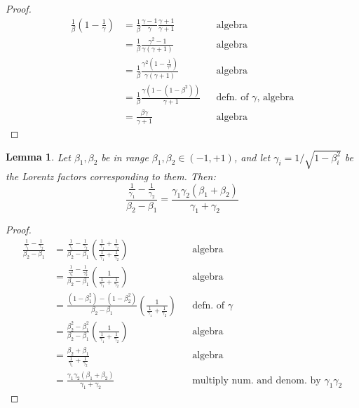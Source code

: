 \documentclass[a4paper]{article}
\theoremstyle{plain}
\newtheorem{lemma}[theorem]{Lemma}
\theoremstyle{definition}
\begin{document}
\begin{proof}
\begin{align*}
\frac{1}{\beta} (1-\frac{1}{\gamma})
  & = \frac{1}{\beta} \frac{\gamma-1}{\gamma} \frac{\gamma+1}{\gamma+1} & & \text{algebra} \\
  & = \frac{1}{\beta} \frac{\gamma^2-1}{\gamma(\gamma+1)} & & \text{algebra} \\
  & = \frac{1}{\beta} \frac{\gamma^2(1-\frac{1}{\gamma^2})}{\gamma(\gamma+1)} & & \text{algebra} \\
  & = \frac{1}{\beta} \frac{\gamma(1-(1-\beta^2))}{\gamma+1} & & \text{defn. of $\gamma$, algebra} \\
  & = \frac{\beta\gamma}{\gamma+1} & & \text{algebra}
\end{align*}
\end{proof}

\begin{lemma}
\label{lem:betaGammaIdentity2}
Let $\beta_1, \beta_2$ be in range $\beta_1, \beta_2 \in (-1, +1)$,
and let $\gamma_i = 1/\sqrt{1-\beta_i^2}$ be the Lorentz factors
corresponding to them.
Then:
\begin{equation}
\frac{\frac{1}{\gamma_1}-\frac{1}{\gamma_2}}{\beta_2-\beta_1}
  = \frac{\gamma_1\gamma_2(\beta_1+\beta_2)}{\gamma_1+\gamma_2}
\end{equation}
\end{lemma}

\begin{proof}
\begin{align*}
\frac{\frac{1}{\gamma_1}-\frac{1}{\gamma_2}}{\beta_2-\beta_1}
  & = \frac{\frac{1}{\gamma_1}-\frac{1}{\gamma_2}}{\beta_2-\beta_1} \left( \frac{\frac{1}{\gamma_1}+\frac{1}{\gamma_2}}{\frac{1}{\gamma_1}+\frac{1}{\gamma_2}} \right) & & \text{algebra} \\
  & = \frac{\frac{1}{\gamma_1^2}-\frac{1}{\gamma_2^2}}{\beta_2-\beta_1} \left( \frac{1}{\frac{1}{\gamma_1}+\frac{1}{\gamma_2}} \right) & & \text{algebra} \\
  & = \frac{(1-\beta_1^2)-(1-\beta_2^2)}{\beta_2-\beta_1} \left( \frac{1}{\frac{1}{\gamma_1}+\frac{1}{\gamma_2}} \right) & & \text{defn. of $\gamma$} \\
  & = \frac{\beta_2^2-\beta_1^2}{\beta_2-\beta_1} \left( \frac{1}{\frac{1}{\gamma_1}+\frac{1}{\gamma_2}} \right) & & \text{algebra} \\
  & = \frac{\beta_2+\beta_1}{\frac{1}{\gamma_1}+\frac{1}{\gamma_2}} & & \text{algebra} \\
  & = \frac{\gamma_1\gamma_2(\beta_1+\beta_2)}{\gamma_1+\gamma_2} & & \text{multiply num. and denom. by $\gamma_1\gamma_2$}
\end{align*}
\end{proof}
\end{document}

